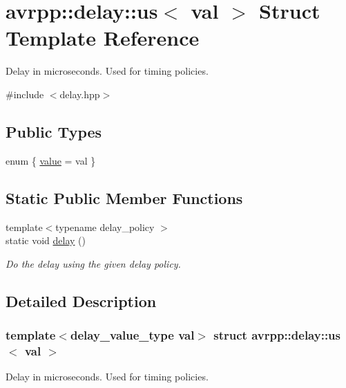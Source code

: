 \hypertarget{structavrpp_1_1delay_1_1us}{
\section{avrpp::delay::us$<$ val $>$ Struct Template Reference}
\label{structavrpp_1_1delay_1_1us}
}


Delay in microseconds. Used for timing policies.  




{\ttfamily \#include $<$delay.hpp$>$}

\subsection*{Public Types}
\begin{DoxyCompactItemize}
\item 
enum \{ \hyperlink{structavrpp_1_1delay_1_1us_a445b44a326be84bb4c4cfe5011d01045a105e86129fbf879ca111cea210ba7b00}{value} =  val
 \}
\end{DoxyCompactItemize}
\subsection*{Static Public Member Functions}
\begin{DoxyCompactItemize}
\item 
{\footnotesize template$<$typename delay\_\-policy $>$ }\\static void \hyperlink{structavrpp_1_1delay_1_1us_af31fc9b9a6d90f7c19e60a14ab40cfa2}{delay} ()
\begin{DoxyCompactList}\small\item\em Do the delay using the given delay policy. \item\end{DoxyCompactList}\end{DoxyCompactItemize}


\subsection{Detailed Description}
\subsubsection*{template$<$delay\_\-value\_\-type val$>$ struct avrpp::delay::us$<$ val $>$}

Delay in microseconds. Used for timing policies. 

